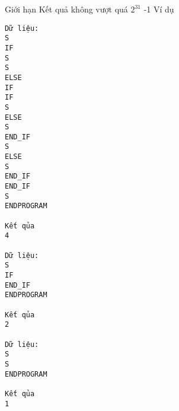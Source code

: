 Giới hạn  
Kết quả không vượt quá $2^{31}$   -1
   Ví dụ  
\begin{verbatim}
Dữ liệu:
S
IF
S
S
ELSE
IF
IF
S
ELSE
S
END_IF
S
ELSE
S
END_IF
END_IF
S
ENDPROGRAM

Kết qủa
4

Dữ liệu:
S
IF
END_IF
ENDPROGRAM

Kết qủa
2

Dữ liệu:
S
S
ENDPROGRAM

Kết qủa
1
\end{verbatim}